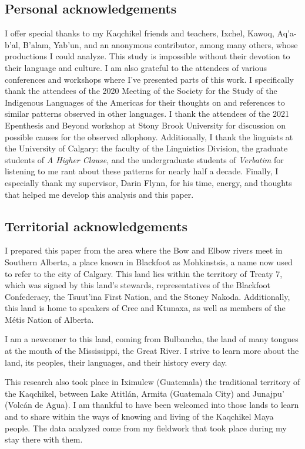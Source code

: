 \documentclass[output=paper,colorlinks,citecolor=brown]{langscibook}
\begin{document}
\subsection*{Personal acknowledgements}
I offer special thanks to my Kaqchikel friends and teachers, Ixchel, Kawoq, Aq’a-b’al, B’alam, Yab’un, and an anonymous contributor, among many others, whose productions I could analyze. This study is impossible without their devotion to their language and culture. I am also grateful to the attendees of various conferences and workshops where I’ve presented parts of this work. I specifically thank the attendees of the 2020 Meeting of the Society for the Study of the Indigenous Languages of the Americas for their thoughts on and references to similar patterns observed in other languages. I thank the attendees of the 2021 Epenthesis and Beyond workshop at Stony Brook University for discussion on possible causes for the observed allophony. Additionally, I thank the linguists at the University of Calgary: the faculty of the Linguistics Division, the graduate students of \emph{A Higher Clause}, and the undergraduate students of \emph{Verbatim} for listening to me rant about these patterns for nearly half a decade. Finally, I especially thank my supervisor, Darin Flynn, for his time, energy, and thoughts that helped me develop this analysis and this paper.

\subsection*{Territorial acknowledgements}
I prepared this paper from the area where the Bow and Elbow rivers meet in Southern Alberta, a place known in Blackfoot as Mohkinstsis, a name now used to refer to the city of Calgary. This land lies within the territory of Treaty 7, which was signed by this land’s stewards, representatives of the Blackfoot Confederacy, the Tsuut’ina First Nation, and the Stoney Nakoda. Additionally, this land is home to speakers of Cree and Ktunaxa, as well as members of the Métis Nation of Alberta.

I am a newcomer to this land, coming from Bulbancha, the land of many tongues at the mouth of the Mississippi, the Great River. I strive to learn more about the land, its peoples, their languages, and their history every day. 

This research also took place in Iximulew (Guatemala) the traditional territory of the Kaqchikel, between Lake Atitlán, Armita (Guatemala City) and Junajpu’ (Volcán de Agua). I am thankful to have been welcomed into those lands to learn and to share within the ways of knowing and living of the Kaqchikel Maya people. The data analyzed come from my fieldwork that took place during my stay there with them.


\printbibliography[heading=subbibliography,notkeyword=this]
\end{document}
